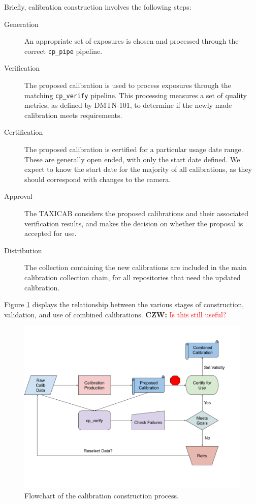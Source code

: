 \documentclass[DM,authoryear,toc]{lsstdoc}
\newcommand{\czw}[1]{
  \textbf{CZW: }\textcolor{red}{#1}
}
\begin{document}
Briefly, calibration construction involves the following steps:
\begin{description}
\item[Generation] An appropriate set of exposures is chosen and processed through the correct \verb|cp_pipe| pipeline.
\item[Verification] The proposed calibration is used to process exposures through the matching \verb|cp_verify| pipeline.  This processing measures a set of quality metrics, as defined by DMTN-101, to determine if the newly made calibration meets requirements.
\item[Certification] The proposed calibration is certified for a particular usage date range.  These are generally open ended, with only the start date defined.  We expect to know the start date for the majority of all calibrations, as they should correspond with changes to the camera.
\item[Approval] The TAXICAB considers the proposed calibrations and their associated verification results, and makes the decision on whether the proposal is accepted for use.
\item[Distribution] The collection containing the new calibrations are included in the main calibration collection chain, for all repositories that need the updated calibration.
\end{description}

Figure \ref{fig:flowchart} displays the relationship between the various stages of construction, validation, and use of combined calibrations. \czw{Is this still useful?}

\begin{figure}
  \includegraphics[width=\linewidth]{figures/flowchart.png}
  \caption{Flowchart of the calibration construction process.}
  \label{fig:flowchart}
\end{figure}
\end{document}
